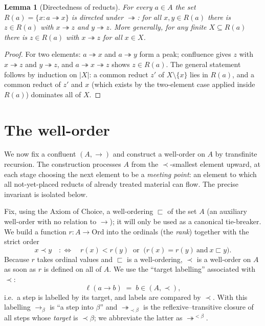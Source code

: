 \documentclass{amsart}
\newtheorem{lemma}{Lemma}
\theoremstyle{definition}
\theoremstyle{remark}
\newcommand{\redto}{\rightarrow}
\newcommand{\redtt}{\twoheadrightarrow}
\begin{document}
\begin{lemma}[Directedness of reducts]\label{lem:dir}
For every $a\in A$ the set $R(a)=\{x: a\redtt x\}$ is directed under $\redtt$:
for all $x,y\in R(a)$ there is $z\in R(a)$ with $x\redtt z$ and $y\redtt z$.
More generally, for any finite $X\subseteq R(a)$ there is $z\in R(a)$ with
$x\redtt z$ for all $x\in X$.
\end{lemma}

\begin{proof}
For two elements: $a\redtt x$ and $a\redtt y$ form a peak; confluence gives $z$
with $x\redtt z$ and $y\redtt z$, and $a\redtt x\redtt z$ shows $z\in R(a)$.
The general statement follows by induction on $|X|$: a common reduct $z'$ of
$X\setminus\{x\}$ lies in $R(a)$, and a common reduct of $z'$ and $x$ (which
exists by the two-element case applied inside $R(a)$) dominates all of $X$.
\end{proof}

\section{The well-order}

We now fix a confluent $(A,\redto)$ and construct a well-order on $A$ by
transfinite recursion.  The construction processes $A$ from the
$\prec$-smallest element upward, at each stage choosing the next element to be a
\emph{meeting point}: an element to which all not-yet-placed reducts of already
treated material can flow.  The precise invariant is isolated below.

Fix, using the Axiom of Choice, a well-ordering $\sqsubset$ of the set $A$ (an
auxiliary well-order with no relation to $\redto$); it will only be used as a
canonical tie-breaker.  We build a function $r\colon A\to\mathrm{Ord}$ into the
ordinals (the \emph{rank}) together with the strict order
\[
   x\prec y \quad:\Longleftrightarrow\quad r(x)<r(y)
   \ \text{ or }\ \bigl(r(x)=r(y)\ \text{and}\ x\sqsubset y\bigr).
\]
Because $r$ takes ordinal values and $\sqsubset$ is a well-ordering, $\prec$ is
a well-order on $A$ as soon as $r$ is defined on all of $A$.  We use the
``target labelling'' associated with $\prec$:
\begin{equation}\label{eq:label}
   \ell(a\redto b)\;=\;b\in (A,\prec),
\end{equation}
i.e.\ a step is labelled by its target, and labels are compared by $\prec$.
With this labelling $\redto_\beta$ is ``a step into $\beta$'' and
$\redtt_{\prec\beta}$ is the reflexive--transitive closure of all steps whose
\emph{target} is $\prec\beta$; we abbreviate the latter as $\redtt^{<\beta}$.
\end{document}
